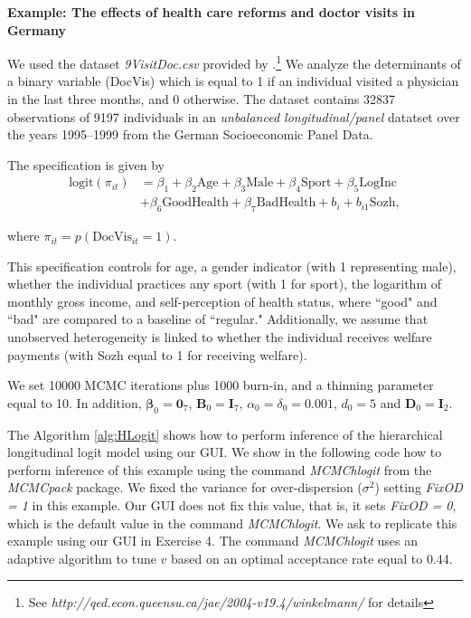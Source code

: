 \textbf{Example: The effects of health care reforms and doctor visits in Germany}

We used the dataset \textit{9VisitDoc.csv} provided by \cite{Winkelmann2004}.\footnote{See \textit{http://qed.econ.queensu.ca/jae/2004-v19.4/winkelmann/} for details} We analyze the determinants of a binary variable (DocVis) which is equal to 1 if an individual visited a physician in the last three months, and 0 otherwise.
The dataset contains 32837 observations of 9197 individuals in an \textit{unbalanced longitudinal/panel} datatset over the years 1995--1999 from the German Socioeconomic Panel Data.

The specification is given by 
\begin{align*}
	\text{logit}(\pi_{it})&=\beta_1+\beta_2\text{Age}+\beta_3\text{Male}+\beta_4\text{Sport}+\beta_5\text{LogInc}\\
	&+\beta_6 \text{GoodHealth} + \beta_7\text{BadHealth} + b_i + b_{i1}\text{Sozh},
\end{align*}

where $\pi_{it}=p(\text{DocVis}_{it}=1)$.

This specification controls for age, a gender indicator (with 1 representing male), whether the individual practices any sport (with 1 for sport), the logarithm of monthly gross income, and self-perception of health status, where ``good" and ``bad" are compared to a baseline of ``regular." Additionally, we assume that unobserved heterogeneity is linked to whether the individual receives welfare payments (with Sozh equal to 1 for receiving welfare). 

We set 10000 MCMC iterations plus 1000 burn-in, and a thinning parameter equal to 10. In addition, $\bm{\beta}_0=\bm{0}_7$, $\bm{B}_0=\bm{I}_7$, $\alpha_0=\delta_0=0.001$, $d_0=5$ and $\bm{D}_0=\bm{I}_2$. 

The Algorithm \ref{alg:HLogit} shows how to perform inference of the hierarchical longitudinal logit model using our GUI. We show in the following code how to perform inference of this example using the command \textit{MCMChlogit} from the \textit{MCMCpack} package. We fixed the variance for over-dispersion ($\sigma^2$) setting \textit{FixOD = 1} in this example. Our GUI does not fix this value, that is, it sets \textit{FixOD = 0}, which is the default value in the command \textit{MCMChlogit}. We ask to replicate this example using our GUI in Exercise 4. The command \textit{MCMChlogit} uses an adaptive algorithm to tune $v$ based on an optimal acceptance rate equal to 0.44. 


